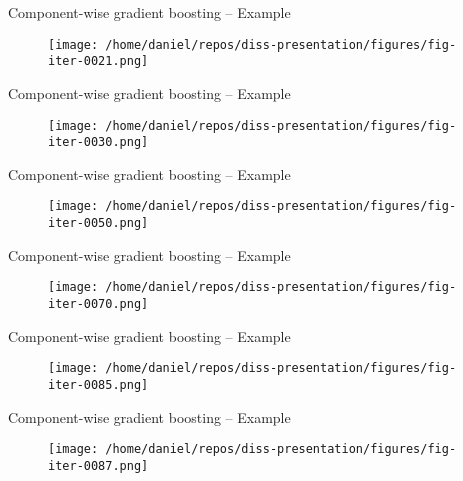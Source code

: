 \begin{frame}{Component-wise gradient boosting -- Example}
	\begin{figure}
		\centering
		\texttt{[image: /home/daniel/repos/diss-presentation/figures/fig-iter-0021.png]}
	\end{figure}
	\addtocounter{framenumber}{-1}
\end{frame}


\begin{frame}{Component-wise gradient boosting -- Example}
	\begin{figure}
		\centering
		\texttt{[image: /home/daniel/repos/diss-presentation/figures/fig-iter-0030.png]}
	\end{figure}
	\addtocounter{framenumber}{-1}
\end{frame}


\begin{frame}{Component-wise gradient boosting -- Example}
	\begin{figure}
		\centering
		\texttt{[image: /home/daniel/repos/diss-presentation/figures/fig-iter-0050.png]}
	\end{figure}
	\addtocounter{framenumber}{-1}
\end{frame}


\begin{frame}{Component-wise gradient boosting -- Example}
	\begin{figure}
		\centering
		\texttt{[image: /home/daniel/repos/diss-presentation/figures/fig-iter-0070.png]}
	\end{figure}
	\addtocounter{framenumber}{-1}
\end{frame}


\begin{frame}{Component-wise gradient boosting -- Example}
	\begin{figure}
		\centering
		\texttt{[image: /home/daniel/repos/diss-presentation/figures/fig-iter-0085.png]}
	\end{figure}
	\addtocounter{framenumber}{-1}
\end{frame}


\begin{frame}{Component-wise gradient boosting -- Example}
	\begin{figure}
		\centering
		\texttt{[image: /home/daniel/repos/diss-presentation/figures/fig-iter-0087.png]}
	\end{figure}
	\addtocounter{framenumber}{-1}
\end{frame}


